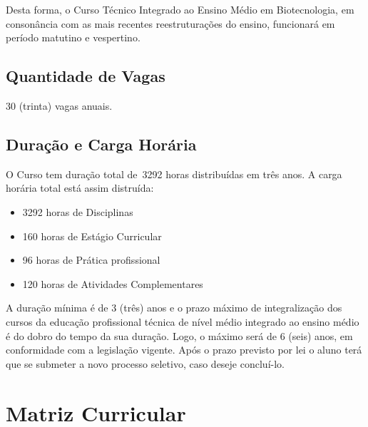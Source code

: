 \documentclass[11pt,fleqn]{book} %
\newcommand{\VER}[1]{\begingroup\color{red}#1\endgroup}
\begin{document}
Desta forma, o Curso Técnico Integrado ao Ensino Médio em Biotecnologia, em consonância com as mais recentes reestruturações do ensino, funcionará em período matutino e vespertino.

\subsection{Quantidade de Vagas}
\indent

30 (trinta) vagas anuais. 

\subsection{Duração e Carga Horária}
\indent

O Curso tem duração total de~\VER{3292} horas distribuídas em três anos.
A carga horária total está assim distruída:
\begin{itemize}
	\item \VER{3292} horas de Disciplinas
	\item \VER{160} horas de Estágio Curricular
	\item \VER{96} horas de Prática profissional
	\item \VER{120} horas de Atividades Complementares
\end{itemize}

A duração mínima é de 3 (três) anos e o prazo máximo de integralização dos cursos da educação profissional técnica de nível médio integrado ao ensino médio é do dobro do tempo da sua duração. 
Logo, o máximo será de 6 (seis) anos, em conformidade com a legislação vigente. 
Após o prazo previsto por lei o aluno terá que se submeter a novo processo seletivo, caso deseje concluí-lo.


\section{Matriz Curricular}\label{matriz}
\indent
%
%
\end{document}
